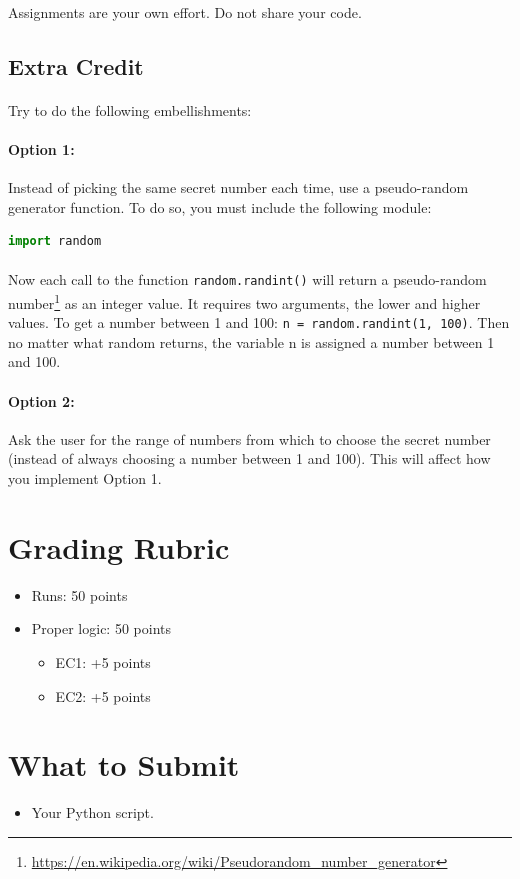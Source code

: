 \documentclass[letter,10pt]{article}
\begin{document}
    \paragraph{}Assignments are your own effort. Do not share your code.
    
    \subsection*{Extra Credit}
    \paragraph{}Try to do the following embellishments:
    
    \paragraph{Option 1:}Instead of picking the same secret number each time, use a pseudo-random generator function. To do so, you must include the following module:
    \begin{lstlisting}[language=python]
        import random
    \end{lstlisting}
    
    \paragraph{}Now each call to the function \texttt{random.randint()} will return a pseudo-random number\footnote{\url{https://en.wikipedia.org/wiki/Pseudorandom\_number\_generator}} as an integer value. It requires two arguments, the lower and higher values. To get a number between 1 and 100: \texttt{n = random.randint(1, 100)}. Then no matter what random returns, the variable n is assigned a number between 1 and 100.
    
    \paragraph{Option 2:}Ask the user for the range of numbers from which to choose the secret number (instead of always choosing a number between 1 and 100). This will affect how you implement Option 1.
    
    \section*{Grading Rubric}
    \begin{itemize}
        \item Runs: 50 points
        \item Proper logic: 50 points
        \begin{itemize}
            \item EC1: +5 points
            \item EC2: +5 points
        \end{itemize}
    \end{itemize}
    
    \section*{What to Submit}
    \begin{itemize}
        \item Your Python script.
    \end{itemize}
\end{document}

